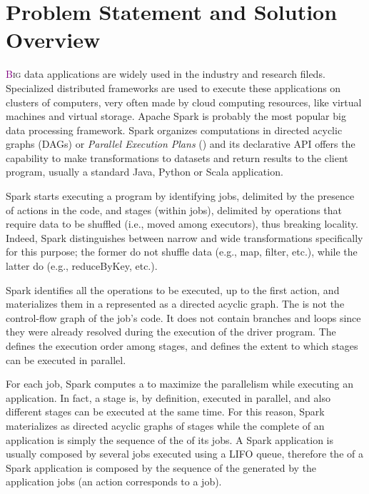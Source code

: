\chapter{Problem Statement and Solution Overview} \label{chap:ProblemAndSolution}

\lettrine[lines=4]{\textcolor{purple}{B}}{ig} data applications are widely used in the industry and research fileds. Specialized   distributed frameworks are used to execute these applications on clusters of computers, very often made by cloud computing resources, like virtual machines and virtual storage. Apache Spark is probably the most popular big data processing framework. Spark organizes computations in directed acyclic graphs (DAGs) or  \textit{Parallel Execution Plans} (\plans) and its declarative API offers the capability to make transformations to datasets and return results to the client program, usually a standard Java, Python or Scala application. 

Spark starts executing a program by identifying jobs, delimited by the presence of actions in the code, and stages (within jobs), delimited by operations that require data to be shuffled (i.e., moved among executors), thus breaking locality. Indeed, Spark distinguishes
between narrow and wide transformations specifically for this purpose; the former do not shuffle data (e.g., map, filter, etc.), while the latter do (e.g., reduceByKey, etc.). 

Spark identifies all the operations to be executed, up to the first action, and
materializes them in a \plan represented as a directed acyclic graph. The \plan is not the control-flow graph of the job’s code. It does not contain branches and loops since they were already resolved during the execution of the driver program. The \plan defines the execution order among stages, and defines the extent to which stages can be executed in parallel. 

For each job, Spark computes a \plan to maximize the parallelism while executing an application. In fact, a stage is, by definition, executed in parallel, and also different stages can be executed at the same time. For this reason, Spark materializes \plans as directed acyclic graphs of stages while the complete \plan of an application is simply the sequence of the \plans of its jobs. A Spark application is usually composed by several jobs executed using a LIFO queue, therefore the \plan of a Spark application is composed by the sequence of the \plans generated by the application jobs (an action corresponds to a job). 

